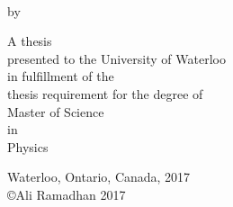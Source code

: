 \begin{titlepage}
    \begin{center}
      \large  
      
      \hfill
      \vfill
      
      \begin{spacing}{1.00}
        {\LARGE \textsc{\myTitle} \\ \bigskip}
      \end{spacing}

      
      by \\ \bigskip
      
      {\Large \myName}
      
      \vfill
      
      A thesis \\
      presented to the University of Waterloo \\
      in fulfillment of the \\
      thesis requirement for the degree of \\
      Master of Science \\
      in \\
      Physics
      
      \vfill
      
      Waterloo, Ontario, Canada, 2017 \\
      \vspace{1 em}
      \copyright Ali Ramadhan 2017
      
      \vfill
      
    \end{center}
\end{titlepage}  
